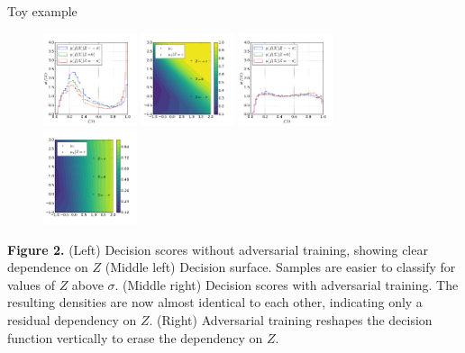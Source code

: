 \documentclass[final,unknownkeysallowed]{beamer}
\begin{document}
\begin{frame}{}
\begin{textblock}{0.32}
\vspace{0.2cm}
\begin{block}{Toy example \phantom{p}}
\begin{figure}
    \begin{center}
        \includegraphics[width=0.245\textwidth]{figures/f-plain.pdf}
        \includegraphics[width=0.245\textwidth]{figures/surface-plain.pdf}
        \includegraphics[width=0.245\textwidth]{figures/f-adversary.pdf}
        \includegraphics[width=0.245\textwidth]{figures/surface-adversary.pdf}
    \end{center}
\end{figure}

{\bf Figure 2.}   (Left) Decision scores
       without adversarial training, showing clear dependence on $Z$
   (Middle left) Decision surface. Samples are easier to classify for values of $Z$ above $\sigma$.
   (Middle right) Decision scores with adversarial training.
      The resulting densities are now almost identical to each other, indicating only a
      residual dependency on $Z$.
   (Right) Adversarial
      training reshapes the decision function vertically to erase the dependency on $Z$.


\end{block}
\end{textblock}
\end{frame}
\end{document}
